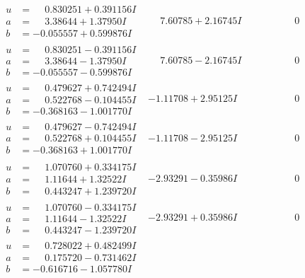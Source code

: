 \documentclass[1p]{elsarticle_modified}
\theoremstyle{definition}
\begin{document}
$$\begin{array}{c|c|c}
\begin{aligned}
u &= \phantom{-}0.830251 + 0.391156 I \\
a &= \phantom{-}3.38644 + 1.37950 I \\
b &= -0.055557 + 0.599876 I\end{aligned}
 & \phantom{-}7.60785 + 2.16745 I & \phantom{-0.000000 } 0 \\ \hline\begin{aligned}
u &= \phantom{-}0.830251 - 0.391156 I \\
a &= \phantom{-}3.38644 - 1.37950 I \\
b &= -0.055557 - 0.599876 I\end{aligned}
 & \phantom{-}7.60785 - 2.16745 I & \phantom{-0.000000 } 0 \\ \hline\begin{aligned}
u &= \phantom{-}0.479627 + 0.742494 I \\
a &= \phantom{-}0.522768 - 0.104455 I \\
b &= -0.368163 - 1.001770 I\end{aligned}
 & -1.11708 + 2.95125 I & \phantom{-0.000000 } 0 \\ \hline\begin{aligned}
u &= \phantom{-}0.479627 - 0.742494 I \\
a &= \phantom{-}0.522768 + 0.104455 I \\
b &= -0.368163 + 1.001770 I\end{aligned}
 & -1.11708 - 2.95125 I & \phantom{-0.000000 } 0 \\ \hline\begin{aligned}
u &= \phantom{-}1.070760 + 0.334175 I \\
a &= \phantom{-}1.11644 + 1.32522 I \\
b &= \phantom{-}0.443247 + 1.239720 I\end{aligned}
 & -2.93291 - 0.35986 I & \phantom{-0.000000 } 0 \\ \hline\begin{aligned}
u &= \phantom{-}1.070760 - 0.334175 I \\
a &= \phantom{-}1.11644 - 1.32522 I \\
b &= \phantom{-}0.443247 - 1.239720 I\end{aligned}
 & -2.93291 + 0.35986 I & \phantom{-0.000000 } 0 \\ \hline\begin{aligned}
u &= \phantom{-}0.728022 + 0.482499 I \\
a &= \phantom{-}0.175720 - 0.731462 I \\
b &= -0.616716 - 1.057780 I\end{aligned}

\end{array}$$
\end{document}
